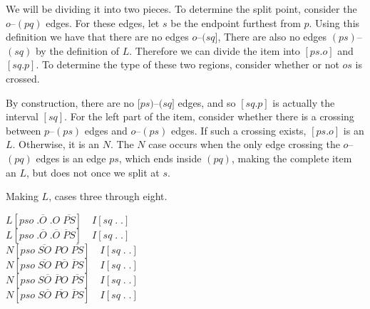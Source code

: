 We will be dividing it into two pieces.
To determine the split point, consider the $o$--$(pq)$ edges.
For these edges, let $s$ be the endpoint furthest from $p$.
Using this definition we have that there are no edges $o$--$(sq]$, 
There are also no edges $(ps)$--$(sq)$ by the definition of $L$.
Therefore we can divide the item into $[ps.o]$ and $[sq.p]$.
To determine the type of these two regions, consider whether or not $os$ is crossed.

\begin{center}
\end{center}

By construction, there are no $[ps)$--$(sq]$ edges, and so $[sq.p]$ is actually the interval $[sq]$.
For the left part of the item, consider whether there is a crossing between $p$--$(ps)$ edges and $o$--$(ps)$ edges.
If such a crossing exists, $[ps.o]$ is an $L$.
Otherwise, it is an $N$.
The $N$ case occurs when the only edge crossing the $o$--$(pq)$ edges is an edge $ps$, which ends inside $(pq)$, making the complete item an $L$, but does not once we split at $s$.

\begin{finalEquation}
\caption{Making $L$, cases three through eight.}
  $L[pso \; .\overline{O} \; .O \; \overline{PS}] \quad I[sq \; . \; .]$ \\
  $L[pso \; .\overline{O} \; .\overline{O} \; \overline{P}S] \quad I[sq \; . \; .]$ \\
  $N[pso \; \overline{SO} \; PO \; \overline{PS}] \quad I[sq \; . \; .]$ \\
  $N[pso \; \overline{SO} \; P\overline{O} \; \overline{P}S] \quad I[sq \; . \; .]$ \\
  $N[pso \; S\overline{O} \; \overline{P}O \; \overline{PS}] \quad I[sq \; . \; .]$ \\
  $N[pso \; S\overline{O} \; \overline{PO} \; \overline{P}S] \quad I[sq \; . \; .]$
\end{finalEquation}

